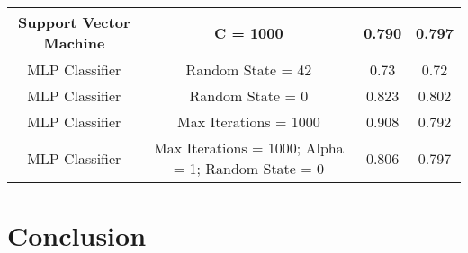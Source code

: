 \documentclass[12pt]{article}
\begin{document}
{\begin{landscape}
\begin{table}[]
\begin{tabular}{|c|c|c|c|}
Support Vector Machine & C = 1000                                           & 0.790              & 0.797             \\ \hline
MLP Classifier         & Random State = 42                                  & 0.73               & 0.72              \\ \hline
MLP Classifier         & Random State = 0                                   & 0.823              & 0.802             \\ \hline
MLP Classifier         & Max Iterations = 1000                              & 0.908              & 0.792             \\ \hline
MLP Classifier         & Max Iterations = 1000; Alpha = 1; Random State = 0 & 0.806              & 0.797             \\ \hline
\end{tabular}
\end{table}
\end{landscape}
\clearpage%
}



\newpage
\section{Conclusion}
\newpage

\end{document}
